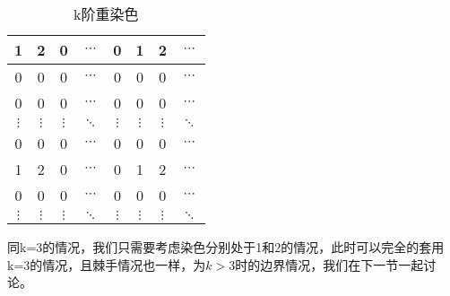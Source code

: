 \begin{table}[h]
	\centering
	\caption{k阶重染色}
	\begin{tabular}{|c|c|c|c|c|c|c|c|}
		\hline
		1        & 2        & 0        & $\cdots$ & 0        & 1        & 2        & $\cdots$ \\
		\hline
		0        & 0        & 0        & $\cdots$ & 0        & 0        & 0        & $\cdots$ \\
		\hline
		0        & 0        & 0        & $\cdots$ & 0        & 0        & 0        & $\cdots$ \\
		\hline
		$\vdots$ & $\vdots$ & $\vdots$ & $\ddots$ & $\vdots$ & $\vdots$ & $\vdots$ & $\ddots$ \\
		\hline
		0        & 0        & 0        & $\cdots$ & 0        & 0        & 0        & $\cdots$ \\
		\hline
		1        & 2        & 0        & $\cdots$ & 0        & 1        & 2        & $\cdots$ \\
		\hline
		0        & 0        & 0        & $\cdots$ & 0        & 0        & 0        & $\cdots$ \\
		\hline
		$\vdots$ & $\vdots$ & $\vdots$ & $\ddots$ & $\vdots$ & $\vdots$ & $\vdots$ & $\ddots$ \\
		\hline
	\end{tabular}
	\label{fig:k-order-staining-last}
\end{table}

同k=3的情况，我们只需要考虑染色分别处于1和2的情况，此时可以完全的套用k=3的情况，且棘手情况也一样，为$k>3$时的边界情况，我们在下一节一起讨论。